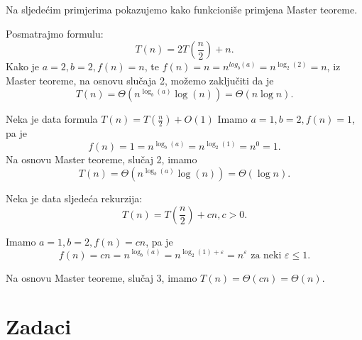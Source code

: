 Na sljedećim primjerima pokazujemo kako funkcioniše primjena Master teoreme. %
 

\begin{example}
	Posmatrajmo formulu:
	$$T(n) = 2T\left(\frac{n}{2}\right) + n.$$
	Kako je $a = 2, b = 2, f(n) = n$, te $f(n) = n = n^{log_b (a)} = n^{\log_2 (2)} = n$, iz Master teoreme, na osnovu slučaja 2,  možemo zaključiti da je 
	$$T(n) = \Theta (n^{\log_b (a)} \log (n)) = \Theta (n \log n).$$
\end{example}

\begin{example} Neka je data formula
	$T(n) = T(\frac{n}{2}) + O(1)$
	Imamo $a = 1, b = 2, f(n) = 1$, pa je $$f(n) = 1 = n^{\log_b (a)} = n^{\log_2 (1)} = n^{0} = 1.$$
	Na osnovu Master teoreme, slučaj 2, imamo
	$$T(n) = \Theta (n^{\log_b (a)} \log (n)) = \Theta (\log n).$$
\end{example}

\begin{example}
	Neka je data sljedeća rekurzija:
	$$T(n) = T(\frac{n}{2}) + cn, c >0.$$
	
	Imamo $a = 1, b = 2, f(n) = cn$, pa je 
	$$f(n) = cn = n^{\log_b (a)} = n^{\log_2 (1) + \varepsilon} = n^{\varepsilon} \text{ za neki } \varepsilon \leq 1.$$
	
	Na osnovu Master teoreme, slučaj 3, imamo %
	$T(n)  = \Theta (cn) = \Theta(n).$
\end{example}

\section{Zadaci}

